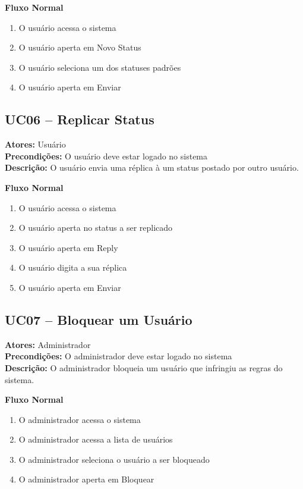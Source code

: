 \documentclass[12pt]{article}
\begin{document}
\textbf{Fluxo Normal}
\begin{enumerate}
  \item O usuário acessa o sistema
  \item O usuário aperta em Novo Status
  \item O usuário seleciona um dos statuses padrões
  \item O usuário aperta em Enviar \\
\end{enumerate}

\subsection{UC06 -- Replicar Status}
\textbf{Atores:} Usuário \\
\textbf{Precondições:} O usuário deve estar logado no sistema \\
\textbf{Descrição:} O usuário envia uma réplica à um status postado por outro usuário.

\textbf{Fluxo Normal}
\begin{enumerate}
  \item O usuário acessa o sistema
  \item O usuário aperta no status a ser replicado
  \item O usuário aperta em Reply
  \item O usuário digita a sua réplica
  \item O usuário aperta em Enviar
\end{enumerate}

\subsection{UC07 -- Bloquear um Usuário}
\textbf{Atores:} Administrador \\
\textbf{Precondições:} O administrador deve estar logado no sistema \\
\textbf{Descrição:} O administrador bloqueia um usuário que infringiu as regras do sistema.

\textbf{Fluxo Normal}
\begin{enumerate} \item O administrador acessa o sistema
  \item O administrador acessa a lista de usuários
  \item O administrador seleciona o usuário a ser bloqueado
  \item O administrador aperta em Bloquear
\end{enumerate}
\end{document}
